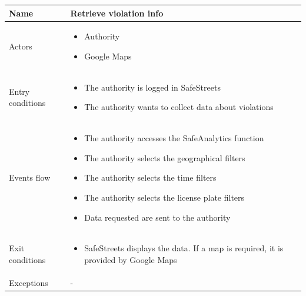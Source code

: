 \documentclass[a4paper]{article}
\begin{document}
\begin{table}[H]
\centering
\begin{tabularx}{\textwidth}{|l|X|}
\hline
Name & Retrieve violation info\tabularnewline
\hline
Actors &
\begin{itemize}[nosep,leftmargin=*]
\item Authority
\item Google Maps
\end{itemize}
\tabularnewline
\hline
Entry conditions &
\begin{itemize}[nosep,leftmargin=*]
\item The authority is logged in SafeStreets
\item The authority wants to collect data about violations
\end{itemize}
\tabularnewline
\hline
Events flow &
\begin{itemize}[nosep,leftmargin=*]
\item The authority accesses the SafeAnalytics function
\item The authority selects the geographical filters
\item The authority selects the time filters
\item The authority selects the license plate filters
\item Data requested are sent to the authority
\end{itemize}
\tabularnewline
\hline
Exit conditions &
\begin{itemize}[nosep,leftmargin=*]
\item SafeStreets displays the data. If a map is required, it is provided
by Google Maps
\end{itemize}
\tabularnewline
\hline
Exceptions & -\tabularnewline
\hline
\end{tabularx}
\end{table}
\end{document}
